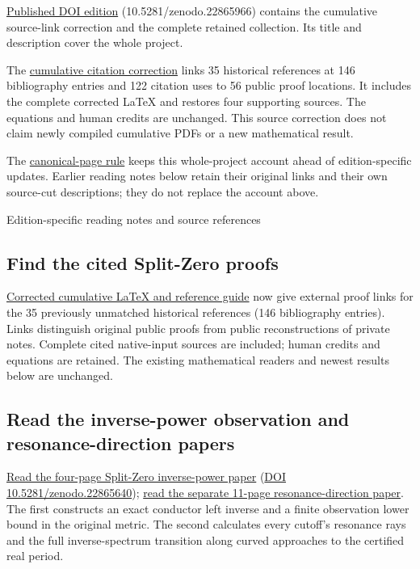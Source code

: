 \documentclass[
]{article}
\begin{document}
\href{https://zenodo.org/records/22865966}{Published DOI edition}
(10.5281/zenodo.22865966) contains the cumulative source-link correction
and the complete retained collection. Its title and description cover
the whole project.

The
\href{https://github.com/KokunoYumeto/zeta-function-research-reader/blob/666ee448d5ecb0bf8a4888f3a2aceaaa5c74d6d8/workbenches/splitzero-tandem/continuations/20260921-historical-proof-citations/README.md}{cumulative
citation correction} links 35 historical references at 146 bibliography
entries and 122 citation uses to 56 public proof locations. It includes
the complete corrected LaTeX and restores four supporting sources. The
equations and human credits are unchanged. This source correction does
not claim newly compiled cumulative PDFs or a new mathematical result.

The
\href{https://github.com/KokunoYumeto/zeta-function-research-reader/blob/main/AGENTS.md}{canonical-page
rule} keeps this whole-project account ahead of edition-specific
updates. Earlier reading notes below retain their original links and
their own source-cut descriptions; they do not replace the account
above.

Edition-specific reading notes and source references

\subsection{Find the cited Split-Zero
proofs}\label{find-the-cited-split-zero-proofs}

\href{https://github.com/KokunoYumeto/zeta-function-research-reader/blob/main/workbenches/splitzero-tandem/continuations/20260921-historical-proof-citations/README.md}{Corrected
cumulative LaTeX and reference guide} now give external proof links for
the 35 previously unmatched historical references (146 bibliography
entries). Links distinguish original public proofs from public
reconstructions of private notes. Complete cited native-input sources
are included; human credits and equations are retained. The existing
mathematical readers and newest results below are unchanged.

\subsection{Read the inverse-power observation and resonance-direction
papers}\label{read-the-inverse-power-observation-and-resonance-direction-papers}

\href{https://zenodo.org/records/22865640}{Read the four-page Split-Zero
inverse-power paper} (\href{https://doi.org/10.5281/zenodo.22865640}{DOI
10.5281/zenodo.22865640});
\href{https://zenodo.org/records/22865640/files/105-splitzero-real-period-directions.pdf?download=1}{read
the separate 11-page resonance-direction paper}. The first constructs an
exact conductor left inverse and a finite observation lower bound in the
original metric. The second calculates every cutoff's resonance rays and
the full inverse-spectrum transition along curved approaches to the
certified real period.
\end{document}
